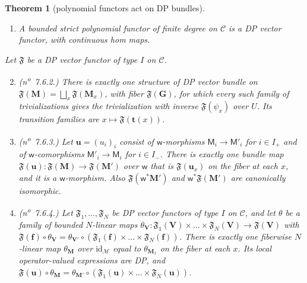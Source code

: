 \documentclass[11pt]{amsart}
\newtheorem{theorem}{Theorem}[section]
\theoremstyle{definition}
\theoremstyle{remark}
\numberwithin{equation}{section}
\newcommand{\id}{\mathrm{id}}
\newcommand{\cC}{\mathcal{C}}
\theoremstyle{plain}
\theoremstyle{definition}
\theoremstyle{plain}
\begin{document}
\begin{theorem}[polynomial functors act on DP bundles]\label{dp:thm:functors-dp}
\leavevmode
\begin{enumerate}
\item A bounded strict polynomial functor of finite degree on $\cC$ is a DP vector functor, with continuous hom maps.
\end{enumerate}
Let $\mathfrak F$ be a DP vector functor of type $I$ on $\cC$.
\begin{enumerate}
\setcounter{enumi}{1}
\item \textup{(n\textsuperscript{o}~7.6.2.)} There is exactly one structure of DP vector bundle on $\mathfrak F(\mathbf M)=\bigsqcup_x\mathfrak F(\mathbf M_x)$, with fiber $\mathfrak F(\mathbf G)$, for which every such family of trivializations gives the trivialization with inverse $\mathfrak F(\psi_x)$ over $U$. Its transition families are $x\mapsto\mathfrak F(\mathbf t(x))$.
\item \textup{(n\textsuperscript{o}~7.6.3.)} Let $\mathbf u=(u_i)_i$ consist of $\mathsf w$-morphisms $\mathsf M_i\to\mathsf M'_i$ for $i\in I_+$ and of $\mathsf w$-comorphisms $\mathsf M'_i\to\mathsf M_i$ for $i\in I_-$. There is exactly one bundle map $\mathfrak F(\mathbf u)\colon\mathfrak F(\mathbf M)\to\mathfrak F(\mathbf M')$ over $\mathsf w$ that is $\mathfrak F(\mathbf u_x)$ on the fiber at each $x$, and it is a $\mathsf w$-morphism. Also $\mathfrak F(\mathsf w^*\mathbf M')$ and $\mathsf w^*\mathfrak F(\mathbf M')$ are canonically isomorphic.
\item \textup{(n\textsuperscript{o}~7.6.4.)} Let $\mathfrak F_1,\dots,\mathfrak F_N$ be DP vector functors of type $I$ on $\cC$, and let $\theta$ be a family of bounded $N$\nobreakdash-linear maps $\theta_{\mathbf V}\colon\mathfrak F_1(\mathbf V)\times\dots\times\mathfrak F_N(\mathbf V)\to\mathfrak F(\mathbf V)$ with $\mathfrak F(\mathbf f)\circ\theta_{\mathbf V}=\theta_{\mathbf V'}\circ(\mathfrak F_1(\mathbf f)\times\dots\times\mathfrak F_N(\mathbf f))$. There is exactly one fiberwise $N$\nobreakdash-linear map $\theta_{\mathbf M}$ over $\id_{\mathcal M}$ equal to $\theta_{\mathbf M_x}$ on the fiber at each $x$. Its local operator-valued expressions are DP, and $\mathfrak F(\mathbf u)\circ\theta_{\mathbf M}=\theta_{\mathbf M'}\circ(\mathfrak F_1(\mathbf u)\times\dots\times\mathfrak F_N(\mathbf u))$.
\end{enumerate}
\end{theorem}
\end{document}
